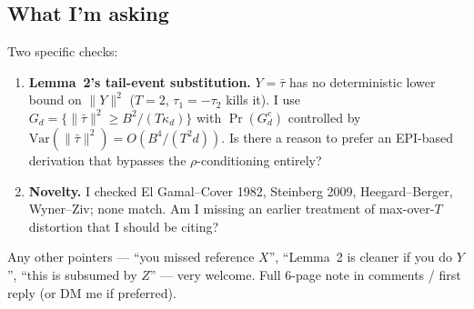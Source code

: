 \documentclass[11pt]{article}
\begin{document}
\subsection*{What I'm asking}

Two specific checks:
\begin{enumerate}[leftmargin=1.6em,itemsep=0.15em]
  \item \textbf{Lemma~2's tail-event substitution.} $Y = \bar\tau$
  has no deterministic lower bound on $\|Y\|^2$ ($T=2$, $\tau_1 =
  -\tau_2$ kills it). I use $G_d = \{\|\bar\tau\|^2 \geq
  B^2/(T\kappa_d)\}$ with $\Pr(G_d^c)$ controlled by
  $\mathrm{Var}(\|\bar\tau\|^2) = O(B^4/(T^2 d))$. Is there a reason
  to prefer an EPI-based derivation that bypasses the
  $\rho$-conditioning entirely?
  \item \textbf{Novelty.} I checked El Gamal--Cover 1982, Steinberg
  2009, Heegard--Berger, Wyner--Ziv; none match. Am I missing an
  earlier treatment of max-over-$T$ distortion that I should be
  citing?
\end{enumerate}

Any other pointers --- ``you missed reference $X$'', ``Lemma~2 is
cleaner if you do $Y$'', ``this is subsumed by $Z$'' --- very
welcome. Full 6-page note in comments / first reply (or DM me if
preferred).
\end{document}
